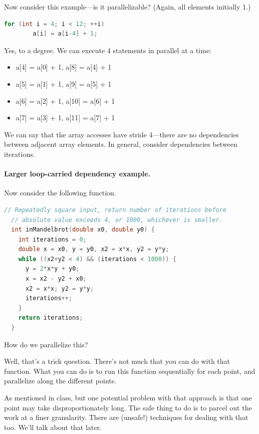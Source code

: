 \documentclass[a4paper]{report}
\begin{document}
  Now consider this example---is it parallelizable? (Again, all elements initially 1.)

\begin{lstlisting}[language=C]
    for (int i = 4; i < 12; ++i)
        a[i] = a[i-4] + 1;
\end{lstlisting}

Yes, to a degree. We can execute 4 statements in parallel at a time:
\begin{itemize}
  \item a[4] = a[0] + 1, a[8] = a[4] + 1
  \item a[5] = a[1] + 1, a[9] = a[5] + 1
  \item a[6] = a[2] + 1, a[10] = a[6] + 1
  \item a[7] = a[3] + 1, a[11] = a[7] + 1
\end{itemize}  
We can say that the array accesses have stride 4---there are no
dependencies between adjacent array elements. In general, consider
dependencies between iterations.

\paragraph{Larger loop-carried dependency example.}
Now consider the following function.

\begin{lstlisting}[language=C]
  // Repeatedly square input, return number of iterations before 
  // absolute value exceeds 4, or 1000, whichever is smaller.
  int inMandelbrot(double x0, double y0) {
    int iterations = 0;
    double x = x0, y = y0, x2 = x*x, y2 = y*y;
    while ((x2+y2 < 4) && (iterations < 1000)) {
      y = 2*x*y + y0;
      x = x2 - y2 + x0;
      x2 = x*x; y2 = y*y;
      iterations++;
    }
    return iterations;
  }
\end{lstlisting}

How do we parallelize this?

Well, that's a trick question. There's not much that you can do with that
function. What you can do is to run this function sequentially for each
point, and parallelize along the different points.

As mentioned in class, but one potential problem with that
approach is that one point may take disproportionately long. The safe thing to do is to parcel out the work
at a finer granularity. There are
(unsafe!) techniques for dealing with that too. We'll talk about that
later.

\end{document}
